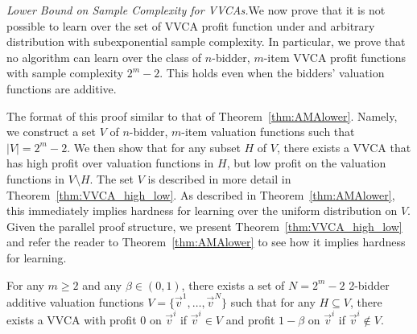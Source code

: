 \bigskip\emph{Lower Bound on Sample Complexity for VVCAs.}We now prove that it is not possible to learn over the set of VVCA profit function under and arbitrary distribution with subexponential sample complexity. In particular, we prove that no algorithm can learn over the class of $n$-bidder, $m$-item VVCA profit functions with sample complexity $2^m - 2$. This holds even when the bidders' valuation functions are additive.

The format of this proof similar to that of Theorem~\ref{thm:AMAlower}. Namely, we construct a set $V$ of $n$-bidder, $m$-item valuation functions such that $|V| = 2^m - 2$. We then show that for any subset $H$ of $V$, there exists a VVCA that has high profit over valuation functions in $H$, but low profit on the valuation functions in $V \setminus H$. The set $V$ is described in more detail in Theorem~\ref{thm:VVCA_high_low}. As described in Theorem~\ref{thm:AMAlower}, this immediately implies hardness for learning over the uniform distribution on $V$. Given the parallel proof structure, we present Theorem~\ref{thm:VVCA_high_low} and refer the reader to Theorem~\ref{thm:AMAlower} to see how it implies hardness for learning.

\begin{theorem}\label{thm:VVCA_high_low}
For any $m \geq 2$ and any $\beta \in (0,1)$, there exists a set of $N = 2^m-2$ 2-bidder additive valuation functions $V = \{\vec{v}^1, \dots, \vec{v}^N\}$ such that for any $H \subseteq V$, there exists a VVCA with profit 0 on $\vec{v}^i$ if $\vec{v}^i \in V$ and profit $1-\beta$ on $\vec{v}^i$ if $\vec{v}^i \not\in V$.
\end{theorem}

